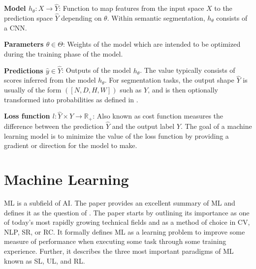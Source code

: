 \textbf{Model $h_{\theta}:X \to \hat{Y}$}: Function to map features from the input space $X$ to the prediction space $\hat{Y}$ depending on $\theta$. Within semantic segmentation, $h_{\theta}$ consists of a \acf{CNN}.

\textbf{Parameters $\theta \in \Theta$}: Weights of the model which are intended to be optimized during the training phase of the model.

\textbf{Predictions $\hat{y}\in \hat{Y}$}: Outputs of the model $h_{\theta}$. The value typically consists of scores inferred from the model $h_{\theta}$. For segmentation tasks, the output shape $\hat{Y}$ is usually of the form $([N,D,H,W])$ such as $Y$, and is then optionally transformed into probabilities as defined in .

\textbf{Loss function $l:\hat{Y}\times Y \to \mathbb{R}_+$}: Also known as cost function measures the difference between the prediction $\hat{Y}$ and the output label $Y$. The goal of a machine learning model is to minimize the value of the loss function by providing a gradient or direction for the model to make.


\section{Machine Learning}
\acf{ML} is a subfield of \acf{AI}. The paper \cite{doi:10.1126/science.aaa8415} provides an excellent summary of \ac{ML} and defines it as the question of . The paper starts by outlining its importance as one of today's most rapidly growing technical fields and as a method of choice in \acf{CV}, \acf{NLP}, \acf{SR}, or \acf{RC}. It formally defines \ac{ML} as a learning problem to improve some measure of performance when executing some task through some training experience. Further, it describes the three most important paradigms of \ac{ML} known as \acf{SL}, \acf{UL}, and \acf{RL}.


